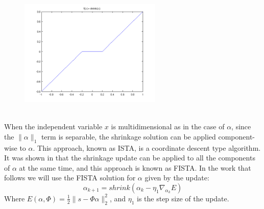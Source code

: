 \documentclass[12pt,a4paper]{article}
\begin{document}
\begin{figure}[ht]
\centering
\includegraphics[height=2in]{shrink.png} 
\end{figure}\\
When the independent variable $x$ is multidimensional as in the case of $\alpha$, since the $\| \alpha \|_1$ term is separable, the shrinkage solution can be applied component-wise to $\alpha$. This approach, known as ISTA, is a coordinate descent type algorithm. It was shown in \cite{FISTA} that the shrinkage update can be applied to all the components of $\alpha$ at the same time, and this approach is known as FISTA. In the work that follows we will use the FISTA solution for $\alpha$ given by the update: 
\begin{equation}
\alpha_{k+1} = shrink(\alpha_k - \eta_1 \nabla_{\alpha_k}E) 
\end{equation}   
Where $E(\alpha,\Phi) = \frac{1}{2} \|s - \Phi \alpha \|_2 ^2$, and  $\eta_1$ is the step size of the update. 
\end{document}
